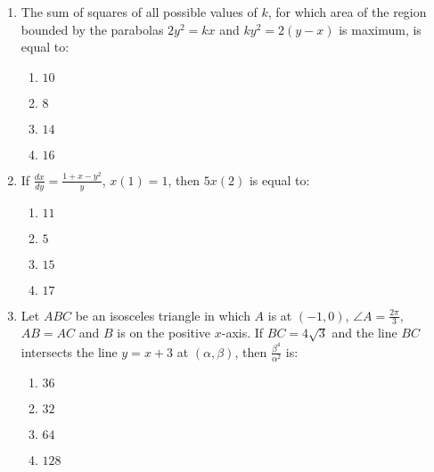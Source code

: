 \documentclass[journal]{IEEEtran}
\newcommand{\brak}[1]{\left( #1 \right)}
\begin{document}
\begin{enumerate}
    \item The sum of squares of all possible values of $k$, for which area of the region bounded by the parabolas $2y^{2}=kx$ and $ky^{2}=2\brak{y-x}$ is maximum, is equal to:

        \begin{multicols}{4}
        \begin{enumerate}
        \item $10$
        \item $8$
        \item $14$
        \item $16$
        \end{enumerate}
        \end{multicols}

    \item If $\frac{dx}{dy}=\frac{1+x-y^{2}}{y}$, $x\brak{1}=1$, then $5x\brak{2}$ is equal to:

        \begin{multicols}{4}
        \begin{enumerate}
        \item $11$
        \item $5$
        \item $15$
        \item $17$
        \end{enumerate}
        \end{multicols}

    \item Let $ABC$ be an isosceles triangle in which $A$ is at $\brak{-1,0}$, $\angle A=\frac{2\pi}{3}$, $AB=AC$ and $B$ is on the positive $x$-axis. If $BC=4\sqrt{3}$ and the line $BC$ intersects the line $y=x+3$ at $\brak{\alpha,\beta}$, then $\frac{\beta^{4}}{\alpha^{2}}$ is:

        \begin{multicols}{4}
        \begin{enumerate}
        \item $36$
        \item $32$
        \item $64$
        \item $128$
        \end{enumerate}
        \end{multicols}       
\end{enumerate}
\end{document}
